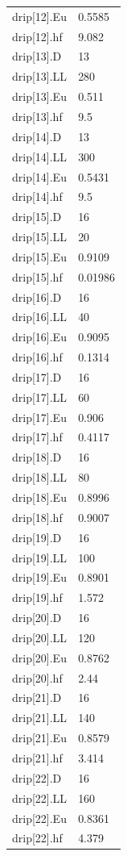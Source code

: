 {\begin{longtable}{p{}p{}}
{}drip[12].Eu & 0.5585\\
{}drip[12].hf & 9.082\\
{}drip[13].D & 13\\
{}drip[13].LL & 280\\
{}drip[13].Eu & 0.511\\
{}drip[13].hf & 9.5\\
{}drip[14].D & 13\\
{}drip[14].LL & 300\\
{}drip[14].Eu & 0.5431\\
{}drip[14].hf & 9.5\\
{}drip[15].D & 16\\
{}drip[15].LL & 20\\
{}drip[15].Eu & 0.9109\\
{}drip[15].hf & 0.01986\\
{}drip[16].D & 16\\
{}drip[16].LL & 40\\
{}drip[16].Eu & 0.9095\\
{}drip[16].hf & 0.1314\\
{}drip[17].D & 16\\
{}drip[17].LL & 60\\
{}drip[17].Eu & 0.906\\
{}drip[17].hf & 0.4117\\
{}drip[18].D & 16\\
{}drip[18].LL & 80\\
{}drip[18].Eu & 0.8996\\
{}drip[18].hf & 0.9007\\
{}drip[19].D & 16\\
{}drip[19].LL & 100\\
{}drip[19].Eu & 0.8901\\
{}drip[19].hf & 1.572\\
{}drip[20].D & 16\\
{}drip[20].LL & 120\\
{}drip[20].Eu & 0.8762\\
{}drip[20].hf & 2.44\\
{}drip[21].D & 16\\
{}drip[21].LL & 140\\
{}drip[21].Eu & 0.8579\\
{}drip[21].hf & 3.414\\
{}drip[22].D & 16\\
{}drip[22].LL & 160\\
{}drip[22].Eu & 0.8361\\
{}drip[22].hf & 4.379\\

\end{longtable}}
